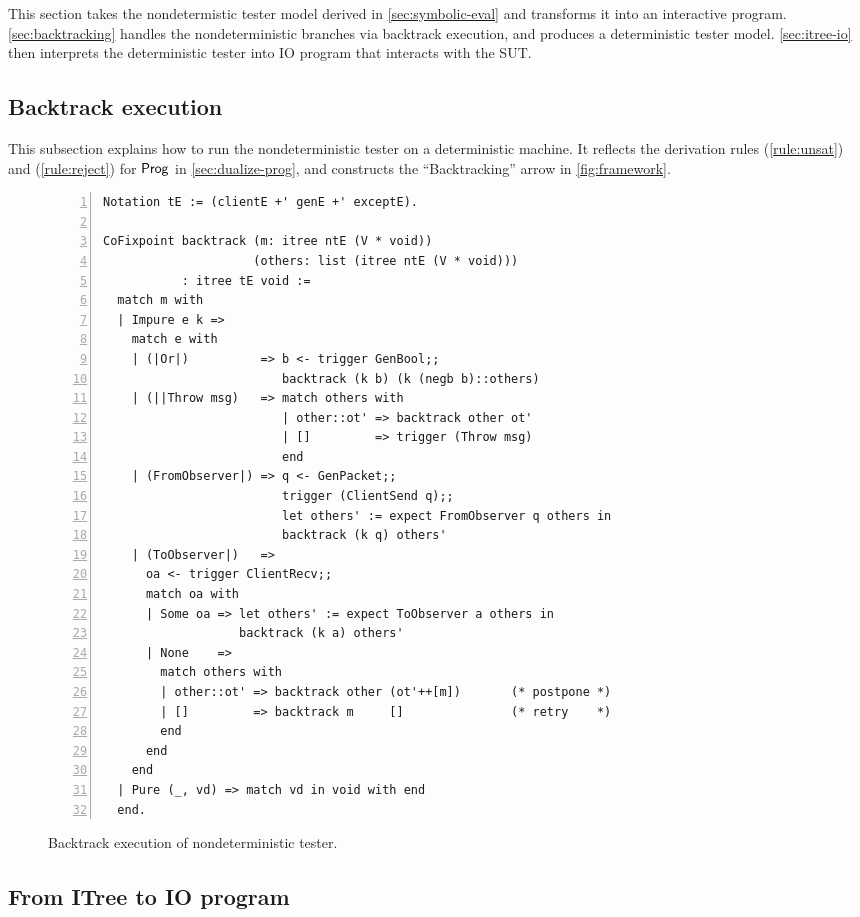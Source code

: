 This section takes the nondetermistic tester model derived in
\autoref{sec:symbolic-eval} and transforms it into an interactive program.
\autoref{sec:backtracking} handles the nondeterministic branches via backtrack
execution, and produces a deterministic tester model.  \autoref{sec:itree-io}
then interprets the deterministic tester into IO program that interacts with the
SUT.

\subsection{Backtrack execution}
\label{sec:backtracking}
This subsection explains how to run the nondeterministic tester on a
deterministic machine.  It reflects the derivation rules (\ref{rule:unsat}) and
(\ref{rule:reject}) for $\mathsf{Prog}$ in \autoref{sec:dualize-prog}, and constructs
the ``Backtracking'' arrow in \autoref{fig:framework}.

\begin{figure}
\begin{lstlisting}[style=customcoq,numbers=left,escapechar=\%]
Notation tE := (clientE +' genE +' exceptE).

CoFixpoint backtrack (m: itree ntE (V * void))
                     (others: list (itree ntE (V * void)))
           : itree tE void :=
  match m with
  | Impure e k =>
    match e with
    | (|Or|)          => b <- trigger GenBool;;
                         backtrack (k b) (k (negb b)::others)
    | (||Throw msg)   => match others with
                         | other::ot' => backtrack other ot'
                         | []         => trigger (Throw msg)
                         end
    | (FromObserver|) => q <- GenPacket;;
                         trigger (ClientSend q);;
                         let others' := expect FromObserver q others in
                         backtrack (k q) others'
    | (ToObserver|)   =>
      oa <- trigger ClientRecv;;
      match oa with
      | Some oa => let others' := expect ToObserver a others in
                   backtrack (k a) others'
      | None    =>
        match others with
        | other::ot' => backtrack other (ot'++[m])       (* postpone *)
        | []         => backtrack m     []               (* retry    *)
        end
      end
    end
  | Pure (_, vd) => match vd in void with end
  end.
\end{lstlisting}
\caption{Backtrack execution of nondeterministic tester.}
\label{fig:backtrack}
\end{figure}

\subsection{From ITree to IO program}
\label{sec:itree-io}

